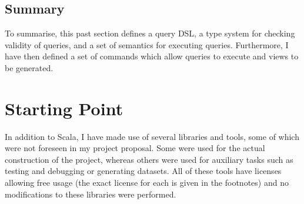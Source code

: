 \documentclass[12pt,a4paper,twoside,openright]{report}
\begin{document}
\subsection{Summary}
To summarise, this past section defines a query DSL, a type system for checking validity of queries, and a set of semantics for executing queries. Furthermore, I have then defined a set of commands which allow queries to execute and views to be generated.


\section{Starting Point}
In addition to Scala, I have made use of several libraries and tools, some of which were not foreseen in my project proposal. Some were used for the actual construction of the project, whereas others were used for auxiliary tasks such as testing and debugging or  generating datasets. All of these tools have licenses allowing free usage (the exact license for each is given in the footnotes) and no modifications to these libraries were performed.\\
\end{document}
